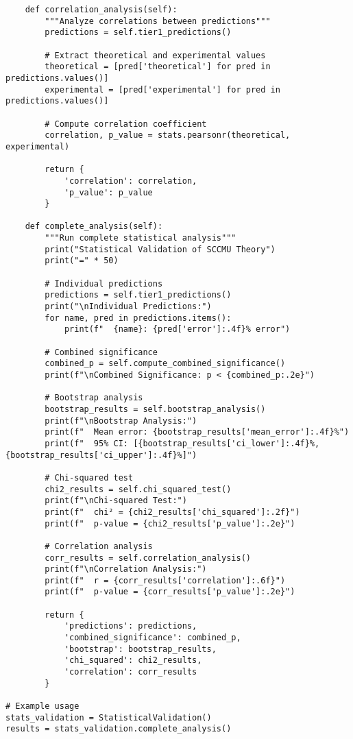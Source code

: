 \documentclass[11pt]{article}
\theoremstyle{definition}
\begin{document}
\begin{verbatim}
    def correlation_analysis(self):
        """Analyze correlations between predictions"""
        predictions = self.tier1_predictions()
        
        # Extract theoretical and experimental values
        theoretical = [pred['theoretical'] for pred in predictions.values()]
        experimental = [pred['experimental'] for pred in predictions.values()]
        
        # Compute correlation coefficient
        correlation, p_value = stats.pearsonr(theoretical, experimental)
        
        return {
            'correlation': correlation,
            'p_value': p_value
        }
    
    def complete_analysis(self):
        """Run complete statistical analysis"""
        print("Statistical Validation of SCCMU Theory")
        print("=" * 50)
        
        # Individual predictions
        predictions = self.tier1_predictions()
        print("\nIndividual Predictions:")
        for name, pred in predictions.items():
            print(f"  {name}: {pred['error']:.4f}% error")
        
        # Combined significance
        combined_p = self.compute_combined_significance()
        print(f"\nCombined Significance: p < {combined_p:.2e}")
        
        # Bootstrap analysis
        bootstrap_results = self.bootstrap_analysis()
        print(f"\nBootstrap Analysis:")
        print(f"  Mean error: {bootstrap_results['mean_error']:.4f}%")
        print(f"  95% CI: [{bootstrap_results['ci_lower']:.4f}%, {bootstrap_results['ci_upper']:.4f}%]")
        
        # Chi-squared test
        chi2_results = self.chi_squared_test()
        print(f"\nChi-squared Test:")
        print(f"  chi² = {chi2_results['chi_squared']:.2f}")
        print(f"  p-value = {chi2_results['p_value']:.2e}")
        
        # Correlation analysis
        corr_results = self.correlation_analysis()
        print(f"\nCorrelation Analysis:")
        print(f"  r = {corr_results['correlation']:.6f}")
        print(f"  p-value = {corr_results['p_value']:.2e}")
        
        return {
            'predictions': predictions,
            'combined_significance': combined_p,
            'bootstrap': bootstrap_results,
            'chi_squared': chi2_results,
            'correlation': corr_results
        }

# Example usage
stats_validation = StatisticalValidation()
results = stats_validation.complete_analysis()
\end{verbatim}
\end{document}
